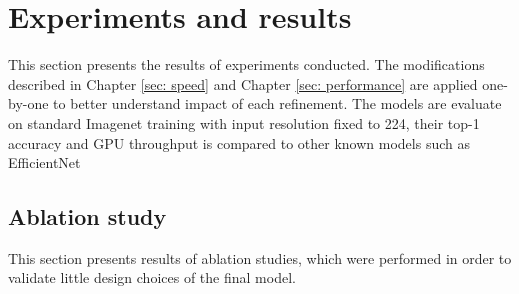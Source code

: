 
% 
\chapter{Experiments and results}


This section presents the results of experiments conducted. The modifications described in Chapter \ref{sec: speed} and Chapter \ref{sec: performance} are applied one-by-one to better understand impact of each refinement. The models are evaluate on standard Imagenet training with input resolution fixed to 224, their top-1 accuracy and GPU throughput is compared to other known models such as EfficientNet \cite{tan2019_efficientnet}








\section{Ablation study} \label{sec:ablation}

This section presents results of ablation studies, which were performed in order to validate little design choices of the final model. 

